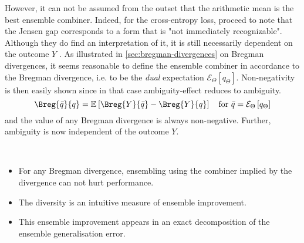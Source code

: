 \documentclass[../main.tex]{subfiles}
\begin{document}
However, it can not be assumed from the outset that the arithmetic mean is the best ensemble combiner. Indeed, for the cross-entropy loss, \citeauthor{abe} proceed to note that the Jensen gap corresponds to a form that is "not immediately recognizable". Although they do find an interpretation of it, it is still necessarily dependent on the outcome $Y$ 
.
As illustrated in \ref{sec:bregman-divergences} on Bregman divergences, 
it seems reasonable to define the ensemble combiner in accordance to the Bregman divergence, i.e. to be the \textit{dual} expectation $\mathcal{E}_{\Theta}\left[ q_{\Theta} \right]$. 
Non-negativity is then easily shown since in that case ambiguity-effect reduces to ambiguity.
$$
\Breg{\bar{q}}{q} = \mathbb{E}_{}\left[ \Breg{Y}{\bar{q}} - \Breg{Y}{q} \right]
\hspace{1em} \text{for $\bar{q} = \mathcal{E}_\Theta\left[q_\Theta\right]$}
$$ and the value of any Bregman divergence is always non-negative. Further, ambiguity is now independent of the outcome $Y$.

\begin{corollary} ~ ~ 
    \begin{itemize}
        \item For any Bregman divergence, ensembling using the combiner implied by the divergence can not hurt performance.
        \item The diversity is an intuitive measure of ensemble improvement.
        \item This ensemble improvement appears in an exact decomposition of the ensemble generalisation error.
    \end{itemize}
\end{corollary}


\end{document}
